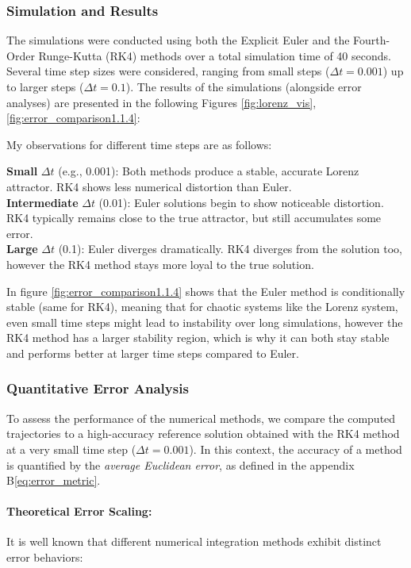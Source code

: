 \subsubsection{Simulation and Results}
The simulations were conducted using both the Explicit Euler and the Fourth-Order Runge-Kutta (RK4) methods over a total simulation time of 40 seconds. Several time step sizes were considered, ranging from small steps ($\Delta t = 0.001$) up to larger steps ($\Delta t = 0.1$). The results of the simulations (alongside error analyses) are presented in the following Figures \ref{fig:lorenz_vis}, \ref{fig:error_comparison1.1.4}:


My observations for different time steps are as follows:

\textbf{Small} $\Delta t$ (e.g., 0.001): Both methods produce a stable, accurate Lorenz attractor. RK4 shows less numerical distortion than Euler.\\

\textbf{Intermediate} $\Delta t$ (0.01): Euler solutions begin to show noticeable distortion. RK4 typically remains close to the true attractor, but still accumulates some error.\\

\textbf{Large} $\Delta t$ (0.1): Euler diverges dramatically. RK4 diverges from the solution too, however the RK4 method stays more loyal to the true solution.

In figure \ref{fig:error_comparison1.1.4} shows that the Euler method is conditionally stable (same for RK4), meaning that for chaotic systems like the Lorenz system, even small time steps might lead to instability over long simulations, however the RK4 method has a larger stability region, which is why it can both stay stable and performs better at larger time steps compared to Euler.

\subsubsection{Quantitative Error Analysis}

To assess the performance of the numerical methods, we compare the computed trajectories to a high-accuracy reference solution obtained with the RK4 method at a very small time step (\(\Delta t = 0.001\)). In this context, the accuracy of a method is quantified by the \emph{average Euclidean error}, as defined in the appendix B\ref{eq:error_metric}.


\paragraph{Theoretical Error Scaling:}
It is well known that different numerical integration methods exhibit distinct error behaviors:

